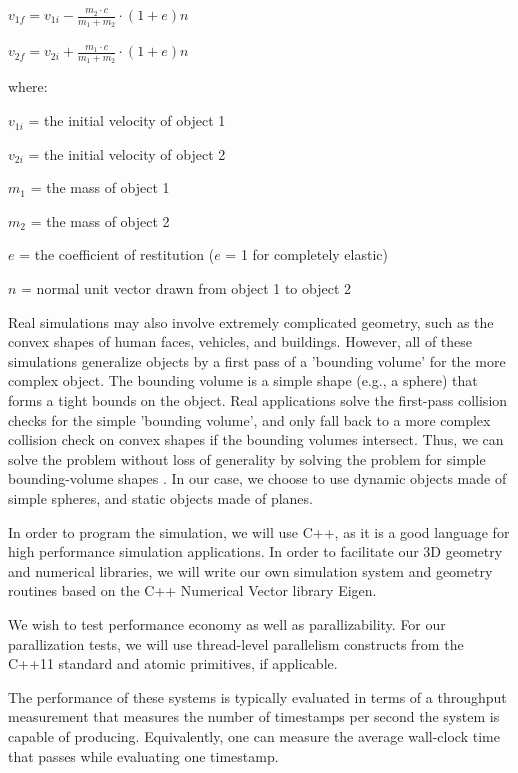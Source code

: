 \documentclass[conference]{IEEEtran}
\begin{document}
\begin{math}
v_{1f} = v_{1i} - \frac{m_2 \cdot c}{m_1 + m_2} \cdot (1 + e)n
\end{math}

\begin{math}
v_{2f} = v_{2i} + \frac{m_1 \cdot c}{m_1 + m_2} \cdot (1 + e)n
\end{math}

where:

$v_{1i}$ = the initial velocity of object 1

$v_{2i}$ = the initial velocity of object 2

$m_1$ = the mass of object 1

$m_2$ = the mass of object 2

$e$ = the coefficient of restitution ($e$ = 1 for completely elastic)

$n$ = normal unit vector drawn from object 1 to object 2


Real simulations may also involve extremely complicated geometry, such as the convex shapes of human faces, vehicles, and buildings.  However, 
all of these simulations generalize objects by a first pass of a 'bounding volume' for the more complex object.  The bounding volume is a simple shape (e.g., a sphere)
that forms a tight bounds on the object.  Real applications solve the first-pass collision checks for the simple 'bounding volume', and only fall back to a more complex
collision check on convex shapes if the bounding volumes intersect.  Thus, we can solve the problem without loss of generality by solving the problem
for simple bounding-volume shapes \cite{uberflow,cloth}.  In our case, we choose to use dynamic objects made of simple spheres, and static objects made of planes.

In order to program the simulation, we will use C++, as it is a good language for high performance simulation applications.  In order to facilitate our 
3D geometry and numerical libraries, we will write our own simulation system and geometry routines based on the C++ Numerical Vector library Eigen.  

We wish to test performance economy as well as parallizability.  For our parallization tests, we will use thread-level parallelism constructs from the C++11 standard and atomic primitives, if applicable.

The performance of these systems is typically evaluated in terms of a throughput measurement that measures the number of timestamps per second the system is capable of producing.  Equivalently, one can measure the average wall-clock time that passes while evaluating one timestamp.
\end{document}
